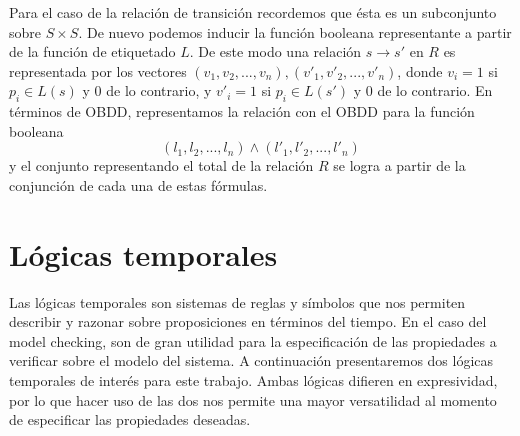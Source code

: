 \documentclass[titlepage, 12pt]{book}
\begin{document}
Para el caso de la relaci\'on de transici\'on recordemos que \'esta es un subconjunto sobre $S\times S$. De nuevo podemos inducir la funci\'on booleana representante a partir de la funci\'on de etiquetado $L$. De este modo una relaci\'on $s\rightarrow s'$ en $R$ es representada por los vectores $(v_1,v_2,...,v_n),(v'_1,v'_2,...,v'_n)$, donde $v_i = 1$ si $p_i \in L(s)$ y 0 de lo contrario, y $v'_i = 1$ si $p_i \in L(s')$ y 0 de lo contrario. En t\'erminos de OBDD, representamos la relaci\'on con el OBDD para la funci\'on booleana $$(l_1,l_2,...,l_n) \wedge (l'_1,l'_2,...,l'_n)$$ y el conjunto representando el total de la relaci\'on $R$ se logra a partir de la conjunci\'on de cada una de estas f\'ormulas.














\section{L\'ogicas temporales}
Las l\'ogicas temporales son sistemas de reglas y s\'imbolos que nos permiten describir y razonar sobre proposiciones en t\'erminos del tiempo. En el caso del model checking, son de gran utilidad para la especificaci\'on de las propiedades a verificar sobre el modelo del sistema. A continuaci\'on presentaremos dos l\'ogicas temporales de inter\'es para este trabajo. Ambas l\'ogicas difieren en expresividad, por lo que hacer uso de las dos nos permite una mayor versatilidad al momento de especificar las propiedades deseadas.\\
\end{document}
